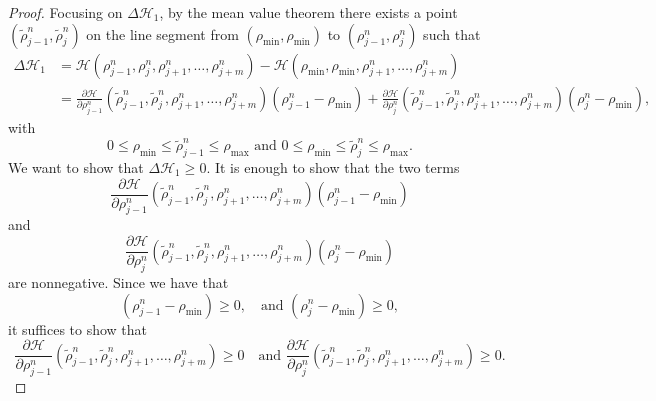 \begin{proof}
    Focusing on $\Delta \mathcal{H}_1$, by the mean value theorem there exists a point $(\tilde{\rho}_{j-1}^n, \tilde{\rho}_{j}^n)$ on the line segment from $(\rho_{\min},\rho_{\min})$ to $(\rho_{j-1}^n,\rho_{j}^n)$ such that
    \begin{align*}
        \Delta \mathcal{H}_1 & =  \mathcal{H}( \rho_{j-1}^n, \rho_{j}^n,  \rho_{j+1}^n,\dots,  \rho_{j+m}^n) - \mathcal{H}( \rho_{\min}, \rho_{\min},  \rho_{j+1}^n,\dots,  \rho_{j+m}^n)                                                                                                                                                                 \\
                             & = \frac{\partial \mathcal{H}}{\partial \rho_{j-1}^n} ( \tilde{\rho}_{j-1}^n, \tilde{\rho}_{j}^n, \rho_{j+1}^n, \dots, \rho_{j+m}^n)(\rho_{j-1}^n- \rho_{\min}) + \frac{\partial \mathcal{H}}{\partial \rho_{j}^n} ( \tilde{\rho}_{j-1}^n, \tilde{\rho}_{j}^n, \rho_{j+1}^n, \dots, \rho_{j+m}^n)(\rho_{j}^n- \rho_{\min}),
    \end{align*}
    with
    \[0 \leq \rho_{\min} \leq \tilde{\rho}_{j-1}^n \leq \rho_{\max} \text{ and } 0 \leq \rho_{\min} \leq \tilde{\rho}_{j}^n \leq \rho_{\max}.\]
    We want to show that $\Delta \mathcal{H}_1 \geq 0$. It is enough to show that the two terms
    \begin{equation}\label{eq:H_1_first_term}
        \frac{\partial \mathcal{H}}{\partial \rho_{j-1}^n} ( \tilde{\rho}_{j-1}^n, \tilde{\rho}_{j}^n, \rho_{j+1}^n, \dots, \rho_{j+m}^n)(\rho_{j-1}^n- \rho_{\min})
    \end{equation}
    and
    \begin{equation}\label{eq:H_1_second_term}
        \frac{\partial \mathcal{H}}{\partial \rho_{j}^n} ( \tilde{\rho}_{j-1}^n, \tilde{\rho}_{j}^n, \rho_{j+1}^n, \dots, \rho_{j+m}^n)(\rho_{j}^n- \rho_{\min})
    \end{equation}
    are nonnegative. Since we have that
    \[
        (\rho_{j-1}^n- \rho_{\min}) \geq 0, \quad \text{and } (\rho_{j}^n- \rho_{\min}) \geq 0,
    \]
    it suffices to show that
    \[
        \frac{\partial \mathcal{H}}{\partial \rho_{j-1}^n} ( \tilde{\rho}_{j-1}^n, \tilde{\rho}_{j}^n, \rho_{j+1}^n, \dots, \rho_{j+m}^n)\geq 0 \quad \text{and }
        \frac{\partial \mathcal{H}}{\partial \rho_{j}^n} ( \tilde{\rho}_{j-1}^n, \tilde{\rho}_{j}^n, \rho_{j+1}^n, \dots, \rho_{j+m}^n)\geq 0.
    \]


\end{proof}
